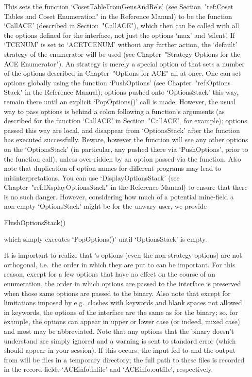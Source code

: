 This    sets    the    function    `CosetTableFromGensAndRels'    (see
Section~"ref:Coset  Tables  and  Coset  Enumeration"  in  the   {\GAP}
Reference  Manual)  to  be  the  function  `CallACE'   (described   in
Section~"CallACE"), which then can be  called  with  all  the  options
defined for the {\ACE} interface,  not  just  the  options  `max'  and
`silent'. If `TCENUM'  is  set  to  `ACETCENUM'  without  any  further
action, the `default' strategy of the {\ACE} enumerator will  be  used
(see Chapter~"Strategy Options for the  ACE  Enumerator").  An  {\ACE}
strategy is merely a special option of {\ACE} that sets  a  number  of
the options described in Chapter~"Options for ACE" all  at  once.  One
can  set  options  globally  using  the  function  `PushOptions'  (see
Chapter~"ref:Options Stack" in the {\GAP} Reference  Manual);  options
pushed onto `OptionsStack' this way, remain there  until  an  explicit
`PopOptions()' call is made. However, the usual way to pass options is
behind a colon following a function's arguments (as described for  the
function `CallACE' in Section~"CallACE", for example); options  passed
this way are  local,  and  disappear  from  `OptionsStack'  after  the
function has executed successfully. Beware, however the function  will
see any other options on the `OptionsStack' (in particular, any pushed
there  via  `PushOptions',  prior  to  the  function   call),   unless
over-ridden by an option passed  via  the  function.  Also  note  that
duplication of  option  names  for  different  programs  may  lead  to
misinterpretations.   You   can   use    `DisplayOptionsStack'    (see
Chapter~"ref:DisplayOptionsStack" in the {\GAP} Reference  Manual)  to
ensure that there is no such danger. However, considering how much  of
a potential mine-field a non-empty `OptionsStack'  might  be  for  the
unwary user, we provide

\>FlushOptionsStack()

which simply executes `PopOptions()' until `OptionsStack' is empty.

It  is  important  to  realize  that  {\ACE}'s   options   (even   the
non-strategy options) are not orthogonal, i.e.\  the  order  in  which
they are put to {\ACE} can be important. For this reason, except for a
few options that have no effect on the course of an  enumeration,  the
order in which options are passed to the {\ACE} interface is preserved
when those same options are passed to the  {\ACE}  binary.  Also  note
that except for limitations  imposed  by  {\GAP}  e.g.\  clashes  with
{\GAP} keywords and blank spaces not allowed in keywords, the  options
of the {\ACE} interface are the  same  as  for  the  binary;  so,  for
example, the options can appear in upper or  lower  case  (or  indeed,
mixed case) and most may be abbreviated. Note that  any  options  that
the {\ACE} binary doesn't understand are simply ignored and a  warning
is sent  to  standard  error  (which  should  appear  in  your  {\GAP}
session). If this occurs, the input fed to {\ACE} and the output  from
{\ACE} will be files in a temporary directory; the full path to  these
files  is  recorded  in  the  record   fields   `ACEinfo.infile'   and
`ACEinfo.outfile', respectively.

